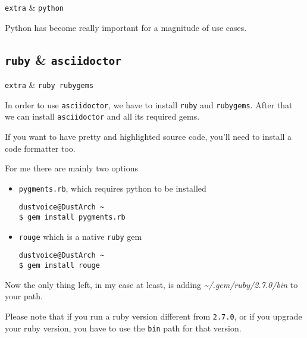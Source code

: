 \documentclass[10pt]{dustdoc}
\begin{document}
\begin{packagetable}
    \texttt{extra} & \texttt{python} \\ 
\end{packagetable}

Python has become really important for a magnitude of use cases.

\subsection{\texttt{ruby} \& \texttt{asciidoctor}}
\label{sec:ruby-and-asciidoctor}

\begin{packagetable}
    \texttt{extra} & \texttt{ruby rubygems} \\ 
\end{packagetable}

In order to use \texttt{asciidoctor}, we have to install \texttt{ruby} and \texttt{rubygems}.
After that we can install \texttt{asciidoctor} and all its required gems.

\begin{NOTE}
    If you want to have pretty and highlighted source code, you’ll need to install a code formatter too.

    For me there are mainly two options

    \begin{itemize}
        \item \texttt{pygments.rb}, which requires python to be installed

            \begin{verbatim}
dustvoice@DustArch ~
$ gem install pygments.rb
            \end{verbatim}

        \item \texttt{rouge} which is a native \texttt{ruby} gem

            \begin{verbatim}
dustvoice@DustArch ~
$ gem install rouge
            \end{verbatim}
    \end{itemize}
\end{NOTE}

Now the only thing left, in my case at least, is adding \textit{\~{}/.gem/ruby/2.7.0/bin} to your path.

\begin{NOTE}
    Please note that if you run a ruby version different from \texttt{2.7.0}, or if you upgrade your ruby version, you have to use the \texttt{bin} path for that version.
\end{NOTE}
\end{document}
